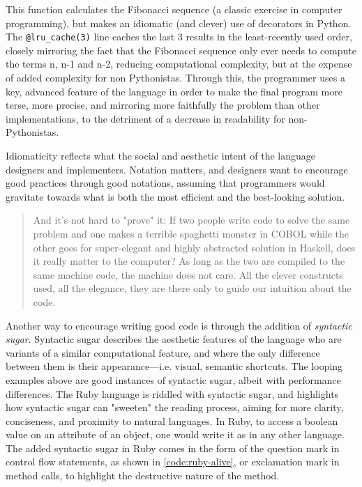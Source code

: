 \begin{listing}
  \inputminted{python}{./corpus/fibonacci.py}
  \caption{\emph{fibonacci.py} - The decorator \lstinline{@lru} is the idiotmatic way to calculate the sum of the Fibonacci sequence. \citep{schmitz_what_2015}}
  \label{code:fibonacci}
\end{listing}

This function calculates the Fibonacci sequence (a classic exercise in computer programming), but makes an idiomatic (and clever) use of decorators in Python. The \lstinline{@lru_cache(3)} line caches the last 3 results in the least-recently used order, closely mirroring the fact that the Fibonacci sequence only ever needs to compute the terms n, n-1 and n-2, reducing computational complexity, but at the expense of added complexity for non Pythonistas. Through this, the programmer uses a key, advanced feature of the language in order to make the final program more terse, more precise, and mirroring more faithfully the problem than other implementations, to the detriment of a decrease in readability for non-Pythonistas.

Idiomaticity reflects what the social and aesthetic intent of the language designers and implementers. Notation matters, and designers want to encourage good practices through good notations, assuming that programmers would gravitate towards what is both the most efficient and the best-looking solution.

\begin{quote}
  And it's not hard to "prove" it: If two people write code to solve the same problem and one makes a terrible spaghetti monster in COBOL while the other goes for super-elegant and highly abstracted solution in Haskell, does it really matter to the computer? As long as the two are compiled to the same machine code, the machine does not care. All the clever constructs used, all the elegance, they are there only to guide our intuition about the code. \citep{sustrik_nature_2021}
\end{quote}

Another way to encourage writing good code is through the addition of \emph{syntactic sugar}. Syntactic sugar describes the aesthetic features of the language who are variants of a similar computational feature, and where the only difference between them is their appearance—i.e. visual, semantic shortcuts. The looping examples above are good instances of syntactic sugar, albeit with performance differences. The Ruby language is riddled with syntactic sugar, and highlights how syntactic sugar can "sweeten" the reading process, aiming for more clarity, conciseness, and proximity to natural languages. In Ruby, to access a boolean value on an attribute of an object, one would write it as in any other language. The added syntactic sugar in Ruby comes in the form of the question mark in control flow statements, as shown in \autoref{code:ruby-alive}, or exclamation mark in method calls, to highlight the destructive nature of the method.

